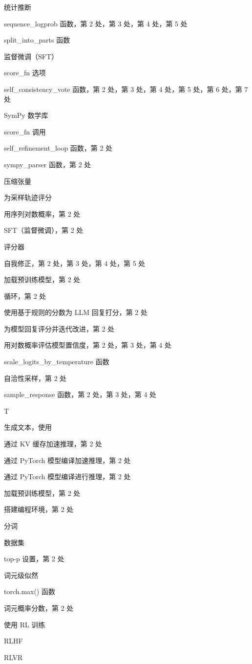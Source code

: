 统计推断

sequence\_logprob 函数，第 2 处，第 3 处，第 4 处，第 5 处

split\_into\_parts 函数

监督微调（SFT）

score\_fn 选项

self\_consistency\_vote 函数，第 2 处，第 3 处，第 4 处，第 5 处，第 6 处，第 7 处

SymPy 数学库

score\_fn 调用

self\_refinement\_loop 函数，第 2 处

sympy\_parser 函数，第 2 处

压缩张量

为采样轨迹评分

用序列对数概率，第 2 处

SFT（监督微调），第 2 处

评分器

自我修正，第 2 处，第 3 处，第 4 处，第 5 处

加载预训练模型，第 2 处

循环，第 2 处

使用基于规则的分数为 LLM 回复打分，第 2 处

为模型回复评分并迭代改进，第 2 处

用对数概率评估模型置信度，第 2 处，第 3 处，第 4 处

scale\_logits\_by\_temperature 函数

自洽性采样，第 2 处

sample\_response 函数，第 2 处，第 3 处，第 4 处

T

生成文本，使用

通过 KV 缓存加速推理，第 2 处

通过 PyTorch 模型编译加速推理，第 2 处

通过 PyTorch 模型编译进行推理，第 2 处

加载预训练模型，第 2 处

搭建编程环境，第 2 处

分词

数据集

top-p 设置，第 2 处

词元级似然

torch.max() 函数

词元概率分数，第 2 处

使用 RL 训练

RLHF

RLVR

